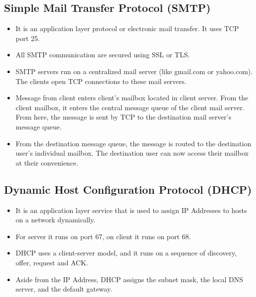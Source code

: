 \documentclass{article}
\theoremstyle{plain}
\theoremstyle{definition}
\begin{document}
\subsection{Simple Mail Transfer Protocol (SMTP)}
\begin{itemize}
    \item It is an application layer protocol or electronic mail transfer. It uses TCP port 25.
    
    \item All SMTP communication are secured using SSL or TLS.
    
    \item SMTP servers run on a centralized mail server (like gmail.com or yahoo.com). The clients open TCP connections to these mail servers.
    
    \item Message from client enters client's mailbox located in client server. From the client mailbox, it enters the central message queue of the client mail server. From here, the message is sent by TCP to the destination mail server's message queue.
    
    \item From the destination message queue, the message is routed to the destination user's individual mailbox. The destination user can now access their mailbox at their convenience. 
\end{itemize}

\subsection{Dynamic Host Configuration Protocol (DHCP)}
\begin{itemize}
    \item It is an application layer service that is used to assign IP Addresses to hosts on a network dynamically. 
    
    \item For server it runs on port 67, on client it runs on port 68. 
    
    \item DHCP uses a client-server model, and it runs on a sequence of discovery, offer, request and ACK. 
    
    \item Aside from the IP Address, DHCP assigns the subnet mask, the local DNS server, and the default gateway. 
\end{itemize}
\end{document}
